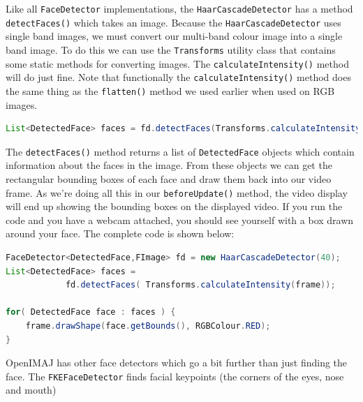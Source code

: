 Like all \verb+FaceDetector+ implementations, the \verb+HaarCascadeDetector+ has a method \verb+detectFaces()+
which takes an image. Because the \verb+HaarCascadeDetector+ uses single band images, we must convert 
our multi-band colour image into a single band image. To do this we can use the \verb+Transforms+ utility 
class that contains some static methods for converting images. The \verb+calculateIntensity()+ method 
will do just fine. Note that functionally the \verb+calculateIntensity()+ method does the same thing 
as the \verb+flatten()+ method we used earlier when used on RGB images.
\begin{lstlisting}[language=java]
List<DetectedFace> faces = fd.detectFaces(Transforms.calculateIntensity(frame));
\end{lstlisting}
The \verb+detectFaces()+ method returns a list of \verb+DetectedFace+ objects which contain 
information about the faces in the image. From these objects we can get the rectangular 
bounding boxes of each face and draw them back into our video frame. As we're doing all 
this in our \verb+beforeUpdate()+ method, the video display will end up showing the 
bounding boxes on the displayed video. If you run the code and you have a webcam attached,
you should see yourself with a box drawn around your face. The complete code is shown below:
\begin{lstlisting}[language=java]
FaceDetector<DetectedFace,FImage> fd = new HaarCascadeDetector(40);
List<DetectedFace> faces =
            fd.detectFaces( Transforms.calculateIntensity(frame));

for( DetectedFace face : faces ) {
    frame.drawShape(face.getBounds(), RGBColour.RED);
}
\end{lstlisting}
OpenIMAJ has other face detectors which go a bit further than just finding the face. 
The \verb+FKEFaceDetector+ finds facial keypoints (the corners of the eyes, nose and mouth) 
